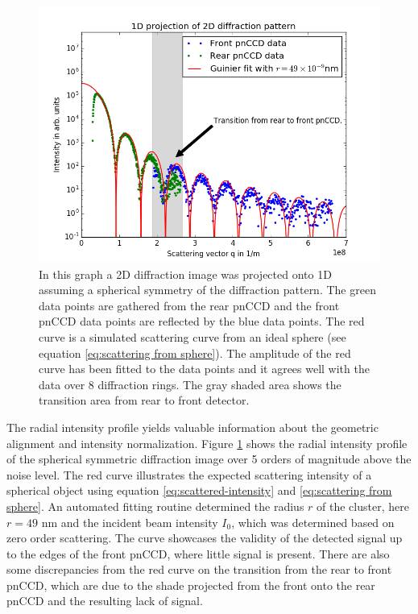 \begin{figure}
	\centering
		\includegraphics[height=0.50\textwidth]{images/pnCCD-1d-sum.png}
	\caption[Spherical projection of 2D diffraction image in 1D.]{In this graph a 2D diffraction image was projected onto 1D assuming a spherical symmetry of the diffraction pattern. The green data points are gathered from the rear pnCCD and the front pnCCD data points are reflected by the blue data points. The red curve is a simulated scattering curve from an ideal sphere (see equation \eqref{eq:scattering from sphere}). The amplitude of the red curve has been fitted to the data points and it agrees well with the data over 8 diffraction rings. The gray shaded area shows the transition area from rear to front detector.}
	\label{fig:pnCCD-1d-sum}
\end{figure}
The radial intensity profile yields valuable information about the geometric alignment and intensity normalization. Figure \ref{fig:pnCCD-1d-sum} shows the radial intensity profile of the spherical symmetric diffraction image over 5 orders of magnitude above the noise level. The red curve illustrates the expected scattering intensity of a spherical object using equation \eqref{eq:scattered-intensity} and \eqref{eq:scattering from sphere}. An automated fitting routine determined the radius $r$ of the cluster, here $r=49$ nm and the incident beam intensity $I_{0}$, which was determined based on zero order scattering. The curve showcases the validity of the detected signal up to the edges of the front pnCCD, where little signal is present. There are also some discrepancies from the red curve on the transition from the rear to front pnCCD, which are due to the shade projected from the front onto the rear pnCCD and the resulting lack of signal.
%
%
%
